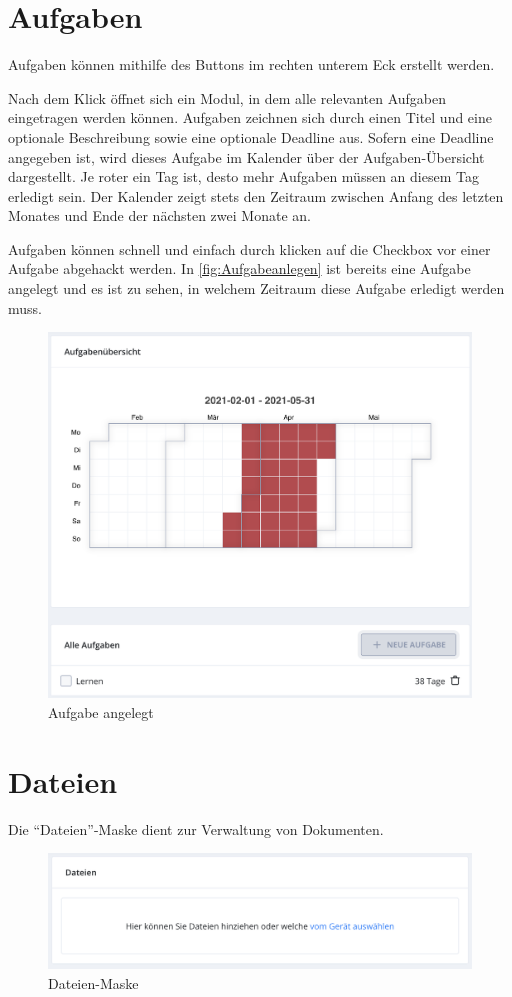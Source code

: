 \section{Aufgaben}\label{sec:Aufgaben}
Aufgaben können mithilfe des Buttons im rechten unterem Eck erstellt werden.

Nach dem Klick öffnet sich ein Modul, in dem alle relevanten Aufgaben eingetragen werden können.
Aufgaben zeichnen sich durch einen Titel und eine optionale Beschreibung sowie eine optionale Deadline aus.
Sofern eine Deadline angegeben ist, wird dieses Aufgabe im Kalender über der Aufgaben-Übersicht dargestellt.
Je roter ein Tag ist, desto mehr Aufgaben müssen an diesem Tag erledigt sein.
Der Kalender zeigt stets den Zeitraum zwischen Anfang des letzten Monates und Ende der nächsten zwei Monate  an.

Aufgaben können schnell und einfach durch klicken auf die Checkbox vor einer Aufgabe abgehackt werden.
In \autoref{fig:Aufgabeanlegen} ist bereits eine Aufgabe angelegt und es ist zu sehen, in welchem Zeitraum diese Aufgabe erledigt werden muss.
\begin{figure}[h]
    \centering
    \includegraphics[width=.7\textwidth]{img/Aufgabe_angelegt.png}
    \caption{Aufgabe angelegt}
    \label{fig:Aufgabeanlegen}
\end{figure}




\section{Dateien}
Die \enquote{Dateien}-Maske dient zur Verwaltung von Dokumenten.

\begin{figure}[h] 
    \centering
    \includegraphics[width=.7\textwidth]{img/Dateien_uebersicht.png}
    \caption{Dateien-Maske}
    \label{fig:dateien}
\end{figure}

